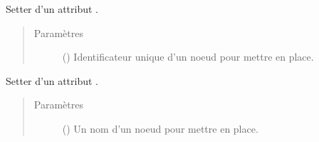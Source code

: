 \documentclass[letterpaper,10pt,french]{sphinxmanual}
\begin{document}
\begin{fulllineitems}
\begin{fulllineitems}
\begin{quote}
\begin{description}
\end{description}\end{quote}

\end{fulllineitems}


\begin{fulllineitems}
\label{\detokenize{index:StrategyTree.NodeST.set_id}}
Setter d’un attribut .
\begin{quote}\begin{description}
\item[{Paramètres}] \leavevmode
{} () \textendash{} Identificateur unique d’un noeud pour mettre en place.

\end{description}\end{quote}

\end{fulllineitems}


\begin{fulllineitems}
\label{\detokenize{index:StrategyTree.NodeST.set_name}}
Setter d’un attribut .
\begin{quote}\begin{description}
\item[{Paramètres}] \leavevmode
{} () \textendash{} Un nom d’un noeud pour mettre en place.

\end{description}\end{quote}

\end{fulllineitems}


\end{fulllineitems}

\end{document}

